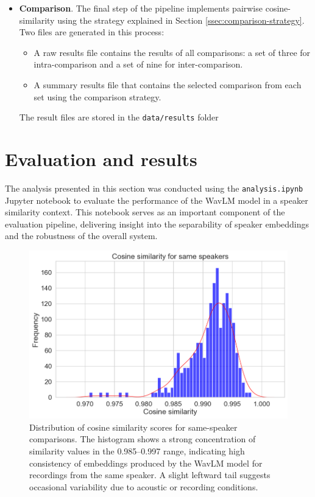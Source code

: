 \documentclass[conference]{IEEEtran}
\begin{document}
\begin{itemize}
	\item \textbf{Comparison}. The final step of the pipeline implements pairwise cosine-similarity using the strategy explained in Section \ref{ssec:comparison-strategy}. Two files are generated in this process:
	\begin{itemize}
		\item A raw results file contains the results of all comparisons: a set of three for intra-comparison and a set of nine for inter-comparison.
		\item A summary results file that contains the selected comparison from each set using the comparison strategy.
	\end{itemize}
	The result files are stored in the \texttt{data/results} folder
\end{itemize}

\section{Evaluation and results}

The analysis presented in this section was conducted using the \texttt{analysis.ipynb} Jupyter notebook to evaluate the performance of the WavLM model in a speaker similarity context. 
This notebook serves as an important component of the evaluation pipeline, delivering insight into the separability of speaker embeddings and the robustness of the overall system.

\begin{figure}[H]
	\centering
	\includegraphics[width=0.7\linewidth]{img/img-self-similarity}
	\caption{Distribution of cosine similarity scores for same-speaker comparisons. The histogram shows a strong concentration of similarity values in the 0.985–0.997 range, indicating high consistency of embeddings produced by the WavLM model for recordings from the same speaker. A slight leftward tail suggests occasional variability due to acoustic or recording conditions.}
	\label{fig:img-self-similarity}
\end{figure}
\end{document}
